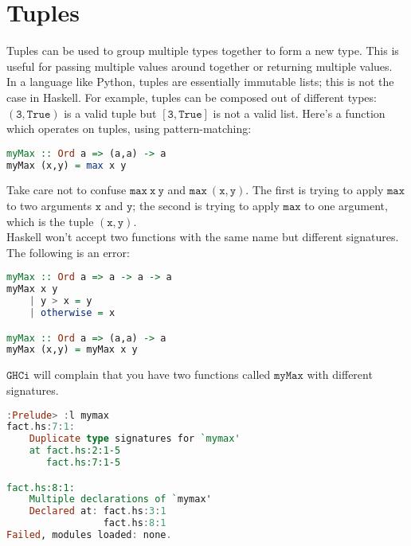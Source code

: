 \documentclass[a4paper,12pt]{article}
\newcommand{\keywadj}[1]{\mathtt{#1}}
\begin{document}
\section{Tuples}

\noindent
Tuples can be used to group multiple types together to form a new type. This is useful for passing multiple values around together or returning multiple values. \\

\noindent
In a language like Python, tuples are essentially immutable lists; this is not the case in Haskell. For example, tuples can be composed out of different types: $\keywadj{(3,True)}$ is a valid tuple but $\keywadj{[3,True]}$ is not a valid list. Here's a function which operates on tuples, using pattern-matching:

\begin{lstlisting}[language=Haskell]
myMax :: Ord a => (a,a) -> a
myMax (x,y) = max x y
\end{lstlisting}

\noindent
Take care not to confuse $\keywadj{max~x~y}$ and $\keywadj{max~(x,y)}$. The first is trying to apply $\keywadj{max}$ to two arguments $\keywadj{x}$ and $\keywadj{y}$; the second is trying to apply $\keywadj{max}$ to one argument, which is the tuple $\keywadj{(x,y)}$. \\

\noindent
Haskell won't accept two functions with the same name but different signatures. The following is an error:

\begin{lstlisting}[language=Haskell]
myMax :: Ord a => a -> a -> a
myMax x y
	| y > x = y
	| otherwise = x

myMax :: Ord a => (a,a) -> a
myMax (x,y) = myMax x y
\end{lstlisting}

\noindent
$\keywadj{GHCi}$ will complain that you have two functions called $\keywadj{myMax}$ with different signatures.

\begin{lstlisting}[language=Haskell]
:Prelude> :l mymax
fact.hs:7:1:
    Duplicate type signatures for `mymax'
    at fact.hs:2:1-5
       fact.hs:7:1-5

fact.hs:8:1:
    Multiple declarations of `mymax'
    Declared at: fact.hs:3:1
                 fact.hs:8:1
Failed, modules loaded: none.
\end{lstlisting}
\end{document}
